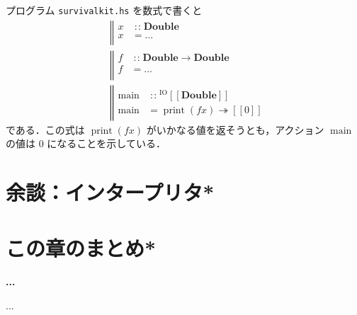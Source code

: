 \documentclass[a5paper,twoside,fleqn,draft]{jsbook}
\def\[{[\![}
\def\]{]\!]}
\newenvironment{note}[1]{\begin{boxnote}\begin{center}\textbf{#1}\end{center}}{\end{boxnote}}
\newcommand{\filename}[1]{\texttt{#1}}
\newcommand{\mBrace}{\Vert}
\newcommand{\mAction}[1]{\mathrm{#1}}
\DeclareMathOperator{\mMain}{\mAction{main}}
\DeclareMathOperator{\mPrint}{\mAction{print}}
\DeclareMathOperator{\mBindRightIgnore}{\twoheadrightarrow}
\DeclareMathOperator{\mFuncArrow}{\rightarrow}
\DeclareMathOperator{\mIn}{{:\!:}}
\newcommand{\mType}[1]{\mathbf{#1}} %
\newcommand{\mDoubleType}{\mType{Double}}
\newcommand{\mTypeAssemble}[2]{{}^\mathrm{#1}\[\mType{#2}\]}
\newcommand{\mIOType}[1]{\mTypeAssemble{IO}{#1}}
\newcommand{\mIODoubleType}{\mIOType{\mDoubleType}}
\newcommand{\mPureWith}[1]{\[#1\]}
\newcommand{\mProjEXP}[2]{#1\mFuncArrow#2} %
\begin{document}
プログラム \filename{survivalkit.hs} を数式で書くと
\begin{align}
  {}&\left\mBrace
    \begin{aligned}
      x&\mIn\mDoubleType\\
      x&=\dots\\
    \end{aligned}
    \right.\\
  {}&\left\mBrace
    \begin{aligned}
      f&\mIn{}\mProjEXP{\mDoubleType}{\mDoubleType}\\
      f&=\dots\\
    \end{aligned}
    \right.\\
  {}&\left\mBrace
    \begin{aligned}
      \mMain&\mIn{}\mIODoubleType\\
      \mMain&=\mPrint(fx)\mBindRightIgnore\mPureWith{0}
    \end{aligned}
    \right.
\end{align}
である．この式は $\mPrint(fx)$ がいかなる値を返そうとも，アクション
$\mMain$ の値は $0$ になることを示している．

\section{余談：インタープリタ*}

\section{この章のまとめ*}

\begin{note}{...}
...
\end{note}

\end{document}
